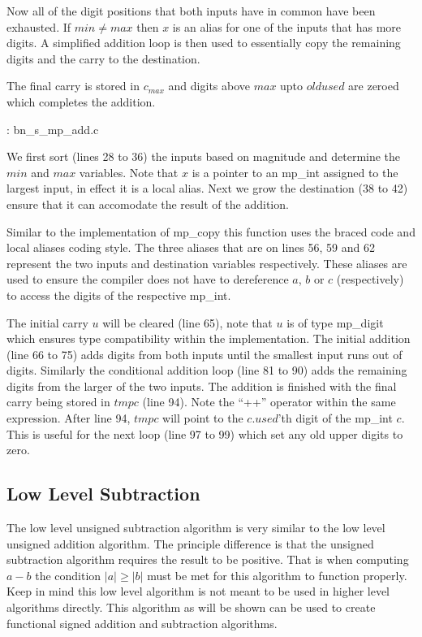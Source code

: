 \documentclass[b5paper]{book}
\begin{document}
Now all of the digit positions that both inputs have in common have been exhausted.  If $min \ne max$ then $x$ is an alias
for one of the inputs that has more digits.  A simplified addition loop is then used to essentially copy the remaining digits
and the carry to the destination.

The final carry is stored in $c_{max}$ and digits above $max$ upto $oldused$ are zeroed which completes the addition.


\vspace{+3mm}\begin{small}
\hspace{-5.1mm}{\bf File}: bn\_s\_mp\_add.c
\vspace{-3mm}
\begin{alltt}
\end{alltt}
\end{small}

We first sort (lines 28 to 36) the inputs based on magnitude and determine the $min$ and $max$ variables.
Note that $x$ is a pointer to an mp\_int assigned to the largest input, in effect it is a local alias.  Next we
grow the destination (38 to 42) ensure that it can accomodate the result of the addition. 

Similar to the implementation of mp\_copy this function uses the braced code and local aliases coding style.  The three aliases that are on 
lines 56, 59 and 62 represent the two inputs and destination variables respectively.  These aliases are used to ensure the
compiler does not have to dereference $a$, $b$ or $c$ (respectively) to access the digits of the respective mp\_int.

The initial carry $u$ will be cleared (line 65), note that $u$ is of type mp\_digit which ensures type 
compatibility within the implementation.  The initial addition (line 66 to 75) adds digits from
both inputs until the smallest input runs out of digits.  Similarly the conditional addition loop
(line 81 to 90) adds the remaining digits from the larger of the two inputs.  The addition is finished 
with the final carry being stored in $tmpc$ (line 94).  Note the ``++'' operator within the same expression.
After line 94, $tmpc$ will point to the $c.used$'th digit of the mp\_int $c$.  This is useful
for the next loop (line 97 to 99) which set any old upper digits to zero.

\subsection{Low Level Subtraction}
The low level unsigned subtraction algorithm is very similar to the low level unsigned addition algorithm.  The principle difference is that the
unsigned subtraction algorithm requires the result to be positive.  That is when computing $a - b$ the condition $\vert a \vert \ge \vert b\vert$ must 
be met for this algorithm to function properly.  Keep in mind this low level algorithm is not meant to be used in higher level algorithms directly.  
This algorithm as will be shown can be used to create functional signed addition and subtraction algorithms.
\end{document}
